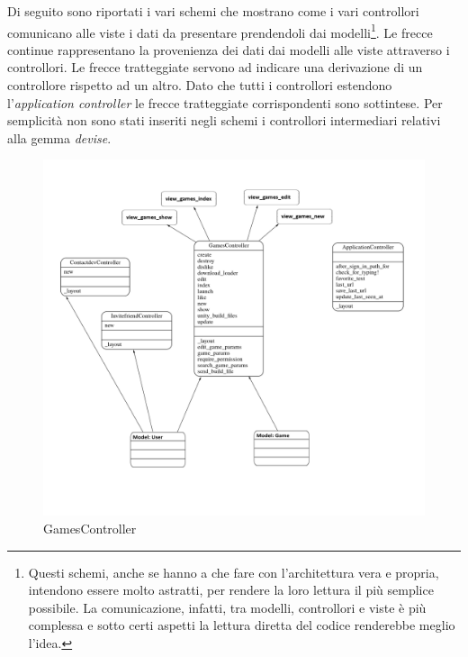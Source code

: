 Di seguito sono riportati i vari schemi che mostrano come i vari controllori comunicano alle viste i dati da presentare prendendoli dai modelli\footnote{Questi schemi, anche se hanno a che fare con l'architettura vera e propria, intendono essere molto astratti, per rendere la loro lettura il più semplice possibile. La comunicazione, infatti, tra modelli, controllori e viste è più complessa e sotto certi aspetti la lettura diretta del codice renderebbe meglio l'idea.}. Le frecce continue rappresentano la provenienza dei dati dai modelli alle viste attraverso i controllori. Le frecce tratteggiate servono ad indicare una derivazione di un controllore rispetto ad un altro. Dato che tutti i controllori estendono l'\emph{application controller} le frecce tratteggiate corrispondenti sono sottintese. Per semplicità non sono stati inseriti negli schemi i controllori intermediari relativi alla gemma \emph{devise}.

\begin{figure}[hbt!]
    \centering
    \includegraphics[width=\textwidth]{games_controller.png}
    \caption{GamesController}
\end{figure}

